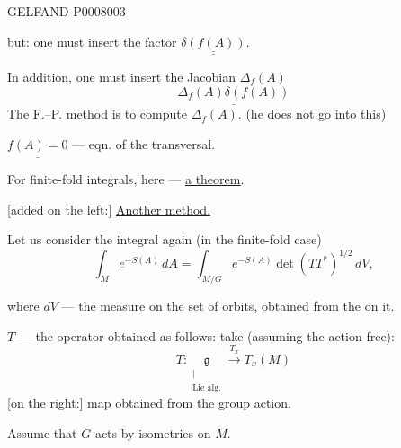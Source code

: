 \begin{GelfandAdjacentEvidence}{GELFAND-P000800}{3}


but: one must insert the factor \(\underline{\underline{\delta(f(A))}}\).

In addition, one must insert the Jacobian \(\Delta_f(A)\)
\begin{equation*}
\underline{\underline{\Delta_f(A)\delta(f(A))}}
\tag{8}
\end{equation*}
The F.–P. method is to compute \(\Delta_f(A)\). (he does not go into this)

\(\underline{\underline{f(A)=0}}\) --- eqn. of the transversal.

For finite-fold integrals, here --- \underline{\underline{a theorem}}.

[added on the left:] \underline{Another method.}

Let us consider the integral again (in the finite-fold case)
\begin{equation*}
\int_M e^{-S(A)}\,dA
=\int_{M/G}e^{-S(A)}\det(TT^*)^{1/2}\,dV,
\tag{9}
\end{equation*}
\end{GelfandAdjacentEvidence}


where \(dV\) --- the measure on the set of orbits, obtained from the  on it.

\(T\) --- the operator obtained as follows: take (assuming the action free):
\[
T:\underset{\substack{\vert\\\text{Lie alg.}}}{\mathfrak g}
\xrightarrow{T_x}T_x(M)
\]
[on the right:] map obtained from the group action.

Assume that \(G\) acts by isometries on \(M\).


